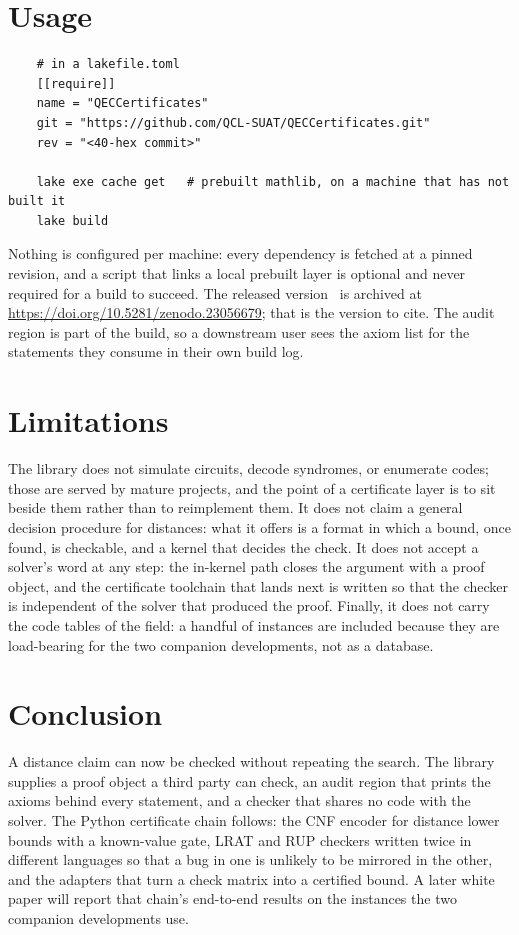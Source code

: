 \documentclass[11pt]{article}
\begin{document}
\section{Usage}

\begin{verbatim}
    # in a lakefile.toml
    [[require]]
    name = "QECCertificates"
    git = "https://github.com/QCL-SUAT/QECCertificates.git"
    rev = "<40-hex commit>"

    lake exe cache get   # prebuilt mathlib, on a machine that has not built it
    lake build
\end{verbatim}

Nothing is configured per machine: every dependency is fetched at a pinned revision, and
a script that links a local prebuilt layer is optional and never required for a build to
succeed. The released version~\cite{qeccertificates} is archived at
\url{https://doi.org/10.5281/zenodo.23056679}; that is the version to cite. The audit region is
part of the build, so a downstream user sees the axiom list for the statements they
consume in their own build log.

\section{Limitations}

The library does not simulate circuits, decode syndromes, or enumerate codes; those are
served by mature projects, and the point of a certificate layer is to sit beside them
rather than to reimplement them. It does not claim a general decision procedure for
distances: what it offers is a format in which a bound, once found, is checkable, and a
kernel that decides the check. It does not accept a solver's word at any step: the
in-kernel path closes the argument with a proof object, and the certificate toolchain that
lands next is written so that the checker is independent of the solver that produced the
proof. Finally, it does not carry the code tables of the field: a handful of instances are
included because they are load-bearing for the two companion developments, not as a
database.

\section{Conclusion}

A distance claim can now be checked without repeating the search. The library supplies a
proof object a third party can check, an audit region that prints the axioms behind every
statement, and a checker that shares no code with the solver. The Python certificate chain
follows: the CNF encoder for distance lower bounds with a known-value gate, LRAT and RUP
checkers written twice in different languages so that a bug in one is unlikely to be
mirrored in the other, and the adapters that turn a check matrix into a certified bound. A
later white paper will report that chain's end-to-end results on the instances the two
companion developments use.
\end{document}
